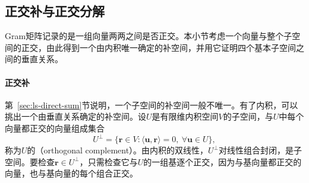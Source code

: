\subsection{正交补与正交分解}
\label{sec:ls-orthogonality}

Gram矩阵记录的是一组向量两两之间是否正交。本小节考虑一个向量与整个子空间的正交，由此得到一个由内积唯一确定的补空间，并用它证明四个基本子空间之间的垂直关系。

\paragraph{正交补}
第~\ref{sec:ls-direct-sum}节说明，一个子空间的补空间一般不唯一。有了内积，可以挑出一个由垂直关系确定的补空间。设$U$是有限维内积空间$V$的子空间，与$U$中每个向量都正交的向量组成集合
\[
 U^\perp=\{\bm r\in V:\langle\bm u,\bm r\rangle=0,\ \forall\bm u\in U\},
\]
称为$U$的（orthogonal complement）。由内积的双线性，$U^\perp$对线性组合封闭，是子空间。要检查$\bm r\in U^\perp$，只需检查它与$U$的一组基逐个正交，因为与基向量都正交的向量，也与基向量的每个组合正交。

